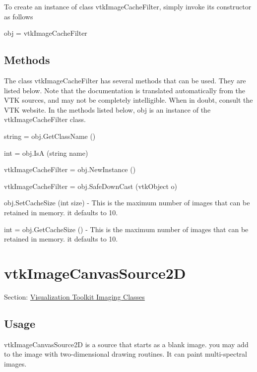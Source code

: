 To create an instance of class vtk\-Image\-Cache\-Filter, simply invoke its constructor as follows \begin{DoxyVerb}  obj = vtkImageCacheFilter
\end{DoxyVerb}
 \hypertarget{vtkwidgets_vtkxyplotwidget_Methods}{}\subsection{Methods}\label{vtkwidgets_vtkxyplotwidget_Methods}
The class vtk\-Image\-Cache\-Filter has several methods that can be used. They are listed below. Note that the documentation is translated automatically from the V\-T\-K sources, and may not be completely intelligible. When in doubt, consult the V\-T\-K website. In the methods listed below, {\ttfamily obj} is an instance of the vtk\-Image\-Cache\-Filter class. 
\begin{DoxyItemize}
\item {\ttfamily string = obj.\-Get\-Class\-Name ()}  
\item {\ttfamily int = obj.\-Is\-A (string name)}  
\item {\ttfamily vtk\-Image\-Cache\-Filter = obj.\-New\-Instance ()}  
\item {\ttfamily vtk\-Image\-Cache\-Filter = obj.\-Safe\-Down\-Cast (vtk\-Object o)}  
\item {\ttfamily obj.\-Set\-Cache\-Size (int size)} -\/ This is the maximum number of images that can be retained in memory. it defaults to 10.  
\item {\ttfamily int = obj.\-Get\-Cache\-Size ()} -\/ This is the maximum number of images that can be retained in memory. it defaults to 10.  
\end{DoxyItemize}\hypertarget{vtkimaging_vtkimagecanvassource2d}{}\section{vtk\-Image\-Canvas\-Source2\-D}\label{vtkimaging_vtkimagecanvassource2d}
Section\-: \hyperlink{sec_vtkimaging}{Visualization Toolkit Imaging Classes} \hypertarget{vtkwidgets_vtkxyplotwidget_Usage}{}\subsection{Usage}\label{vtkwidgets_vtkxyplotwidget_Usage}
vtk\-Image\-Canvas\-Source2\-D is a source that starts as a blank image. you may add to the image with two-\/dimensional drawing routines. It can paint multi-\/spectral images.

